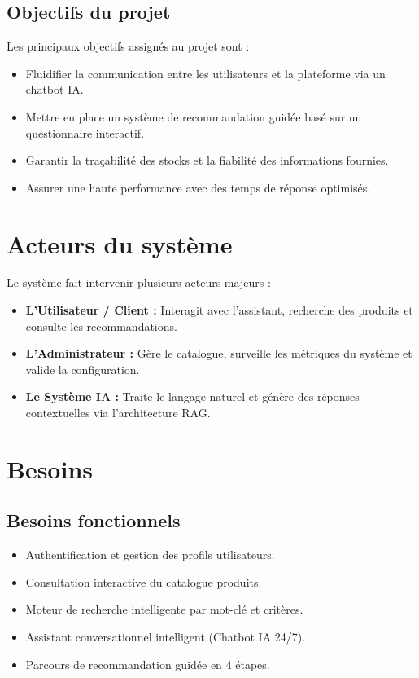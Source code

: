 \documentclass[12pt, a4paper, oneside]{report}
\begin{document}
\subsection{Objectifs du projet}
Les principaux objectifs assignés au projet sont :
\begin{itemize}
  \item Fluidifier la communication entre les utilisateurs et la plateforme via un chatbot IA.
  \item Mettre en place un système de recommandation guidée basé sur un questionnaire interactif.
  \item Garantir la traçabilité des stocks et la fiabilité des informations fournies.
  \item Assurer une haute performance avec des temps de réponse optimisés.
\end{itemize}

\section{Acteurs du système}
Le système fait intervenir plusieurs acteurs majeurs :
\begin{itemize}
  \item \textbf{L'Utilisateur / Client :} Interagit avec l'assistant, recherche des produits et consulte les recommandations.
  \item \textbf{L'Administrateur :} Gère le catalogue, surveille les métriques du système et valide la configuration.
  \item \textbf{Le Système IA :} Traite le langage naturel et génère des réponses contextuelles via l’architecture RAG.
\end{itemize}

\section{Besoins}

\subsection{Besoins fonctionnels}
\begin{itemize}
  \item Authentification et gestion des profils utilisateurs.
  \item Consultation interactive du catalogue produits.
  \item Moteur de recherche intelligente par mot-clé et critères.
  \item Assistant conversationnel intelligent (Chatbot IA 24/7).
  \item Parcours de recommandation guidée en 4 étapes.
\end{itemize}
\end{document}

